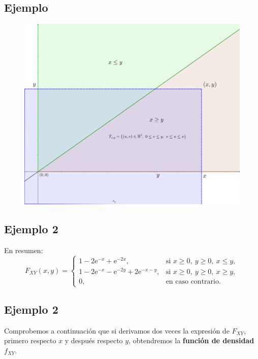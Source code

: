 \documentclass[]{book}
\begin{document}
\hypertarget{ejemplo-54}{%
\subsection{Ejemplo}\label{ejemplo-54}}

\begin{figure}
\includegraphics[width=700px]{Images/Ejemplo2Bidi4} \end{figure}

\hypertarget{ejemplo-2-5}{%
\subsection{Ejemplo 2}\label{ejemplo-2-5}}

En resumen:
\[
F_{XY}(x,y)=\begin{cases}
1-2\mathrm{e}^{-x}+\mathrm{e}^{-2x}, & \mbox{si }x\geq 0,\ y\geq 0,\ x\leq y,\\
1-2\mathrm{e}^{-x}-\mathrm{e}^{-2y}+2\mathrm{e}^{-x-y}, & \mbox{si }x\geq 0,\ y\geq 0,\ x\geq y,\\
0, & \mbox{en caso contrario.}
\end{cases}
\]

\hypertarget{ejemplo-2-6}{%
\subsection{Ejemplo 2}\label{ejemplo-2-6}}

Comprobemos a continuación que si derivamos dos veces la expresión de \(F_{XY}\), primero respecto \(x\) y después respecto \(y\), obtendremos la \textbf{función de densidad} \(f_{XY}\).
\end{document}
